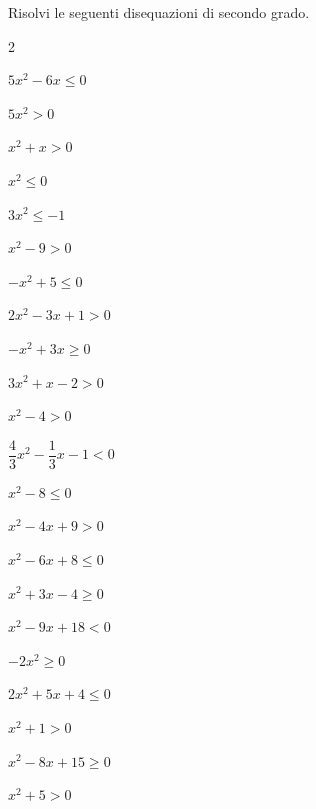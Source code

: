 \begin{esercizio}[*]
\label{ese:4.1}
Risolvi le seguenti disequazioni di secondo grado.

\begin{htmulticols}{2}
\begin{enumeratea}
\item \(5x^2-6x \leqslant 0\) 
\item \(5x^2>0\) 
\item \(x^2+x>0\) 
\item \(x^2 \leqslant 0\) 
\item \(3x^2 \leqslant -1\) \sol{\emptyset }
\item \(x^2-9>0\) 
\item \(-x^2+5 \leqslant 0\) 
\item \(2x^2-3x+1>0\) 
\item \(-x^2+3x \geqslant 0\) 
\item \(3x^2+x-2>0\) 
\item \(x^2-4>0\) 
\item \(\dfrac 4 3x^2-\dfrac 1 3x-1<0\) 
\item \(x^2-8 \leqslant 0\) 
\item \(x^2-4x+9>0\) \sol{\R}
\item \(x^2-6x+8 \leqslant 0\) 
\item \(x^2+3x-4 \geqslant 0\) 
\item \(x^2-9x+18<0\) 
\item \(-2x^2 \geqslant 0\) 
\item \(2x^2+5x+4 \leqslant 0\) \sol{\emptyset}
\item \(x^2+1>0\) \sol{\R}
\item \(x^2-8x+15 \geqslant 0\) 
\item \(x^2+5>0\) \sol{\R}
\end{enumeratea}
\end{htmulticols}
\end{esercizio}

